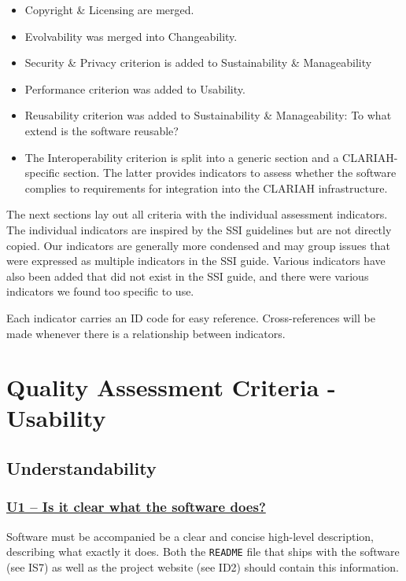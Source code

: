 \documentclass[a4paper,11pt]{article}
\newcommand{\indicator}[1]{\subsubsection*{\underline{#1}}}
\begin{document}
\begin{itemize}
\item Copyright \& Licensing are merged.
\item Evolvability was merged into Changeability.
\item Security \& Privacy criterion is added to Sustainability \& Manageability
\item Performance criterion was added to Usability.
\item Reusability criterion was added to Sustainability \& Manageability: To what extend is the software reusable?
%
%
%
\item The Interoperability criterion is split into a generic section and a CLARIAH-specific section. The latter provides indicators to assess
whether the software complies to requirements for integration into the CLARIAH infrastructure.
\end{itemize}

The next sections lay out all criteria with the individual assessment
indicators. The individual indicators are inspired by the SSI guidelines but
are not directly copied. Our indicators are generally more condensed and may
group issues that were expressed as multiple indicators in the SSI guide.
Various indicators have also been added that did not exist in the SSI guide,
and there were various indicators we found too specific to use.

Each indicator carries an ID code for easy reference. Cross-references will be
made whenever there is a relationship between indicators.

\section{Quality Assessment Criteria - Usability}

\subsection{Understandability}

\indicator{U1 -- Is it clear what the software does?}

Software must be accompanied be a clear and concise high-level description,
describing what exactly it does. Both the \texttt{README} file that ships with
the software (see IS7) as well as the project website (see ID2) should contain
this information. 
\end{document}
